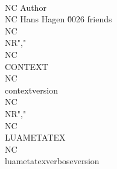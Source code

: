 \\NC Author      \\NC Hans Hagen \u0026 friends        \\NC \\NR","    \\NC \\CONTEXT    \\NC \\contextversion             \\NC \\NR","    \\NC \\LUAMETATEX \\NC \\luametatexverboseversion   %